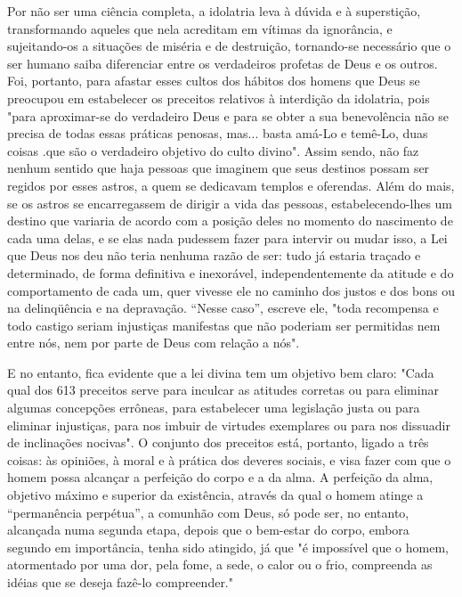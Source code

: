 Por não ser uma ciência completa, a idolatria leva à dúvida e à
su­perstição, transformando aqueles que nela acreditam em vítimas da
ignorância, e sujeitando-os a situações de miséria e de destruição,
tornando-se necessário que o ser humano saiba diferenciar entre os
verdadeiros profetas de Deus e os outros. Foi, portanto, para afastar
esses cultos dos hábitos dos homens que Deus se preocupou em estabelecer
os preceitos relativos à interdição da idolatria, pois "para
aproximar-se do verdadeiro Deus e para se obter a sua benevolência não
se precisa de todas essas práticas penosas, mas... basta amá-Lo e
temê-Lo, duas coisas .que são o verdadeiro objetivo do culto divino".
Assim sendo, não faz nenhum sentido que haja pessoas que imaginem que
seus destinos possam ser regidos por esses astros, a quem se dedicavam
templos e oferendas. Além do mais, se os astros se encarregassem de
dirigir a vida das pessoas, estabelecendo-lhes um destino que variaria
de acordo com a posição deles no momento do
nascimento de cada uma delas, e se elas nada pudessem fazer para
intervir ou mudar isso, a Lei que Deus nos deu não teria nenhuma razão
de ser: tudo já estaria traçado e determinado, de forma definitiva e
inexorável, independente­mente da atitude e do comportamento de cada um,
quer vivesse ele no cami­nho dos justos e dos bons ou na delinqüência e
na depravação. ``Nesse caso'', escreve ele, "toda recompensa e todo
castigo seriam injustiças manifestas que não poderiam ser permitidas nem
entre nós, nem por parte de Deus com rela­ção a nós".

E no entanto, fica evidente que a lei divina tem um objetivo bem claro:
"Cada qual dos 613 preceitos serve para inculcar as atitudes corretas ou
para eliminar algumas concepções errôneas, para estabelecer uma
legislação justa ou para eliminar injustiças, para nos imbuir de
virtudes exemplares ou para nos dissuadir de inclinações nocivas". O
conjunto dos preceitos está, portanto, li­gado a três coisas: às
opiniões, à moral e à prática dos deveres sociais, e visa fazer com que
o homem possa alcançar a perfeição do corpo e a da alma. A perfeição da
alma, objetivo máximo e superior da existência, através da qual o homem
atinge a ``permanência perpétua'', a comunhão com Deus, só pode ser, no
entanto, alcançada numa segunda etapa, depois que o bem-estar do cor­po,
embora segundo em importância, tenha sido atingido, já que "é impossível
que o homem, atormentado por uma dor, pela fome, a sede, o calor ou o
frio, compreenda as idéias que se deseja fazê-lo compreender."

